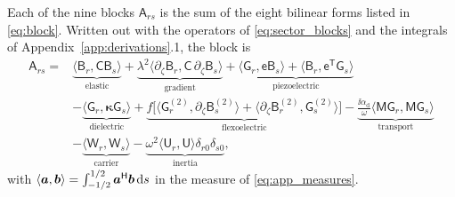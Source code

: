 Each of the nine blocks $\mathsf A_{rs}$ is the sum of the eight bilinear forms
listed in \eqref{eq:block}.  Written out with the operators of
\eqref{eq:sector_blocks} and the integrals of Appendix~\ref{app:derivations}.1,
the block is
\begin{equation}
\label{eq:app_block}
\begin{aligned}
\mathsf A_{rs}={}&\underbrace{\bigl\langle\mathsf B_r,\mathsf C\mathsf B_s
\bigr\rangle}_{\text{elastic}}
+\underbrace{\lambda^{2}\bigl\langle\partial_\zeta\mathsf B_r,
\mathsf C\,\partial_\zeta\mathsf B_s\bigr\rangle}_{\text{gradient}}
+\underbrace{\bigl\langle\mathsf G_r,\mathsf e\mathsf B_s\bigr\rangle
+\bigl\langle\mathsf B_r,\mathsf e^{\mathsf T}\mathsf G_s\bigr\rangle}_{\text{piezoelectric}}\\
&-\underbrace{\bigl\langle\mathsf G_r,\boldsymbol\kappa\mathsf G_s\bigr\rangle
}_{\text{dielectric}}
+\underbrace{f\bigl[\bigl\langle\mathsf G_r^{(2)},\partial_\zeta\mathsf B_s^{(2)}
\bigr\rangle+\bigl\langle\partial_\zeta\mathsf B_r^{(2)},\mathsf G_s^{(2)}
\bigr\rangle\bigr]}_{\text{flexoelectric}}
-\underbrace{\frac{\ii\alpha_{\mathrm d}}{\omega}
\bigl\langle\mathsf M\mathsf G_r,\mathsf M\mathsf G_s\bigr\rangle}_{\text{transport}}\\
&-\underbrace{\bigl\langle\mathsf W_r,\mathsf W_s\bigr\rangle}_{\text{carrier}}
-\underbrace{\omega^{2}\bigl\langle\mathsf U_r,\mathsf U\bigr\rangle\delta_{r0}
\delta_{s0}}_{\text{inertia}},
\end{aligned}
\end{equation}
with $\langle\boldsymbol{a},\boldsymbol{b}\rangle=\int_{-1/2}^{1/2}\boldsymbol{a}^{\mathsf H}\boldsymbol{b}\,
\mathrm{d} s$ in the measure of \eqref{eq:app_measures}.

